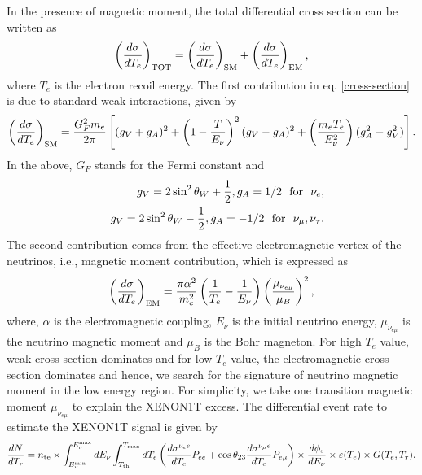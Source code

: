 \documentclass[aps, a4paper,superscriptaddress,12pt,preprintnumbers,floatfix,nofootinbib,amsmath,amssymb]{revtex4}
\newcommand{\nn}{\nonumber}
\def \epsilon {\varepsilon} %
\begin{document}
In the presence of magnetic moment, the total differential cross section can be written as \cite{Giunti:2015gga}
\begin{eqnarray}
    \left( \frac{d \sigma}{d T_{e}} \right)_{\rm TOT} =  \left( \frac{d \sigma}{d T_{e}} \right)_{\rm SM} + \left( \frac{d \sigma}{d T_{e}} \right)_{\rm EM},
    \label{cross-section}
\end{eqnarray}
where $T_{e}$ is the electron recoil energy. The first contribution in eq. \ref{cross-section} is due to standard weak interactions, given by
\begin{equation}
\left( \frac{d \sigma}{d T_{e}} \right)_{\rm SM} =  \frac{G_F^2 m_e}{2\pi} \left[(g_V + g_A)^2 + \left(1-\frac{T}{E_\nu}\right)^2(g_V - g_A)^2 + \left(\frac{m_e T_e}{E_\nu^2}\right)(g^2_A - g^2_V)\right].
\end{equation}
In the above, $G_F$ stands for the Fermi constant and
\begin{eqnarray}
&&g_V = 2\sin^2 \theta_W + \frac{1}{2}, g_A = 1/2 ~~{\rm for}~~ \nu_e, \nn\\
&&g_V = 2\sin^2 \theta_W - \frac{1}{2}, g_A = -1/2 ~~{\rm for}~~ \nu_\mu, \nu_\tau.
\end{eqnarray}
The second contribution comes from the effective electromagnetic vertex of the neutrinos, i.e.,  magnetic moment contribution, which is expressed as
\begin{eqnarray}
    \left( \frac{d \sigma}{d T_{e}} \right)_{\rm EM} = \frac{\pi \alpha^{2}}{m^{2}_{e}} \left( \frac{1}{T_{e}} - \frac{1}{E_{\nu}} \right) \left( \frac{\mu_{\nu_{e\mu}}}{\mu_{B}} \right)^{2},
\end{eqnarray}
where, $\alpha$ is the electromagnetic coupling, $E_{\nu}$ is the initial neutrino energy, $\mu_{\nu_{e \mu}}$ is the neutrino magnetic moment and $\mu_{B}$ is the Bohr magneton. For high $T_{e}$ value, weak cross-section dominates and for low $T_{e}$ value, the electromagnetic cross-section dominates and hence, we search for the signature of neutrino magnetic moment in the low energy region. For simplicity, we take one transition magnetic moment $\mu_{{\nu}_{e \mu}}$ to explain the XENON1T excess. The differential event rate to estimate the XENON1T signal is given by
\begin{equation}
\frac{dN}{ dT_r} =  n_{\rm te}\times \int^{E^{\rm max}_\nu}_{E^{\rm min}_\nu} dE_\nu \int_{T_{\rm th}}^{T_{\rm max}} dT_e \left(\frac{d\sigma^{\nu_e e}}{dT_e} P_{ee} + \cos \theta_{23} \frac{d\sigma^{\nu_\mu e}}{dT_e} P_{e\mu}\right) \times \frac{d\phi_s}{dE_\nu} \times \epsilon(T_e)\times G(T_e,T_r).
\end{equation}
\end{document}

